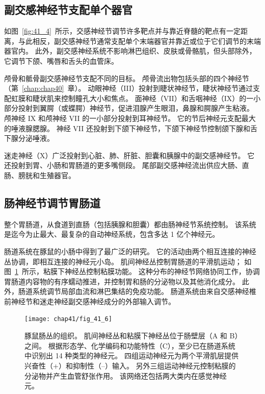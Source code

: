 \subsection{副交感神经节支配单个器官}

如图~\ref{fig:41_4}~所示，交感神经节调节许多靶点并与靠近脊髓的靶点有一定距离，与此相反，副交感神经节通常支配单个末端器官并靠近或位于它们调节的末端器官内。
此外，副交感神经系统不影响淋巴组织、皮肤或骨骼肌，但头部除外，它调节下颌、嘴唇和舌头的血管床。


颅骨和骶骨副交感神经节支配不同的目标。
颅骨流出物包括头部的四个神经节（第~\ref{chap:chap40}~章）。
动眼神经（III）投射到睫状神经节，睫状神经节通过支配虹膜和睫状肌来控制瞳孔大小和焦点。
面神经（VII）和舌咽神经（IX）的一小部分投射到翼腭（或蝶腭）神经节，促进泪腺产生眼泪，鼻腺和腭腺产生粘液。
颅神经 IX 和颅神经 VII 的一小部分投射到耳神经节。
它的节后神经元支配最大的唾液腺腮腺。
神经 VII 还投射到下颌下神经节，下颌下神经节控制颌下腺和舌下腺分泌唾液。


迷走神经（X）广泛投射到心脏、肺、肝脏、胆囊和胰腺中的副交感神经节。
它还投射到胃、小肠和胃肠道的更多嘴侧段。
尾部副交感神经流出供应大肠、直肠、膀胱和生殖器官。



\subsection{肠神经节调节胃肠道}

整个胃肠道，从食道到直肠（包括胰腺和胆囊）都由肠神经节系统控制。
该系统是迄今为止最大、最复杂的自动神经系统，包含多达 1 亿个神经元。


肠道系统在豚鼠的小肠中得到了最广泛的研究。
它的活动由两个相互连接的神经丛协调，即相互连接的神经元小岛。
肌间神经丛控制胃肠道的平滑肌运动；
如图~\ref{fig:41_6}~所示，粘膜下神经丛控制粘膜功能。 
这种分布的神经节网络协同工作，协调胃肠道内容物的有序蠕动推进，并控制胃和肠的分泌物以及其他消化成分。
此外，肠道系统调节局部血流和淋巴集结的免疫功能。
肠道系统由来自交感神经椎前神经节和迷走神经副交感神经成分的外部输入调节。



\begin{figure}[htbp]
	\centering
	\texttt{[image: chap41/fig\_41\_6]}
	\caption{豚鼠肠丛的组织。
		肌间神经丛和粘膜下神经丛位于肠壁层（A 和 B）之间。
		根据形态学、化学编码和功能特性（C），至少已在肠道系统中识别出 14 种类型的神经元。
		四组运动神经元为两个平滑肌层提供兴奋性（+）和抑制性（–）输入。
		另外三组运动神经元控制粘膜的分泌物并产生血管舒张作用。
		该网络还包括两大类内在感觉神经元\cite{furness1980types}。}
	\label{fig:41_6}
\end{figure}


